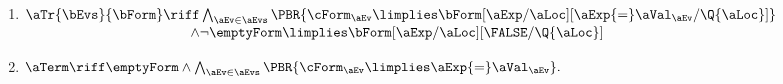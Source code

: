 \begin{scope}
\begin{multicols}{2}
\begin{enumerate}[topsep=0pt,label=(\textsc{w}\arabic*),ref=\textsc{w}\arabic*]
    
  \item \label{write-tau-ca}
    \begin{math}
      \begin{aligned}[t]
        \aTr{\bEvs}{\bForm} \riff
        &\textstyle\bigwedge_{\aEv\in\aEvs}
        \PBR{
          \cForm_\aEv
          \limplies 
          \bForm[\aExp/\aLoc][\aExp{=}\aVal_\aEv/\Q{\aLoc}]
        }
        \\[-.5ex]
        \land
        &
        \lnot \emptyForm
        \limplies 
        \bForm[\aExp/\aLoc][\FALSE/\Q{\aLoc}]
      \end{aligned}
    \end{math}
  \item \label{write-term-ca}
    \begin{math}
      \aTerm \riff
      \emptyForm
      \land
      \bigwedge_{\aEv\in\aEvs}\PBR{\cForm_\aEv \limplies \aExp{=}\aVal_\aEv}.
    \end{math}
  \end{enumerate}
  \end{multicols}


\end{scope}
